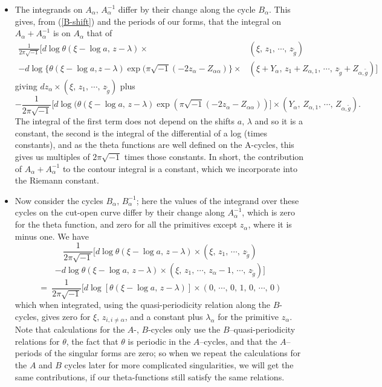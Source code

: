 \documentclass[12pt,reqno]{amsart}
\numberwithin{equation}{section}
\theoremstyle{definition}
\theoremstyle{remark}
\begin{document}
\begin{itemize} 
\item The integrands on $A_\alpha,\,  A_\alpha^{-1}$ differ by their change along the  cycle $B_\alpha$.
This gives, from (\ref{B-shift}) and the periods of our forms, that the integral on $A_\alpha + A_\alpha^{-1}$ is on $A_\alpha$ that of
\begin{align*}
\frac{1}{2\pi\sqrt{-1}}\Big[d\log \theta(\xi -\log a,\, z-\lambda )\times &(\xi,\, z_1,\,\cdots ,\,
z_{\widetilde g})\\
-d\log \{\theta(\xi -\log a, z-\lambda)\exp (\pi\sqrt{-1}(-2z_\alpha -Z_{\alpha\alpha})\}
\times &(\xi +Y_\alpha,\, z_1+Z_{\alpha,1},\,\cdots ,\, z_{\widetilde g}+Z_{\alpha, \widetilde g})\Big]\end{align*}
giving $ dz_\alpha \times  (\xi,\, z_1,\,\cdots ,\,z_{\widetilde g})$ plus 
\begin{equation*}-\frac{1}{2\pi\sqrt{-1}}\big[d\log (\theta(\xi -\log a,\, z-\lambda)
\exp( \pi \sqrt{-1} (-2z_\alpha -Z_{\alpha\alpha}))\big] \times  ( Y_\alpha,\, Z_{\alpha,1},\,
\cdots ,\, Z_{\alpha, \widetilde g}).
\end{equation*}
The integral of the first term does not depend on the shifts $a,\, \lambda$ and so it is a constant,
the second is the integral of the differential of a log (times constants), and as the theta functions
are well defined on the A-cycles, this gives us multiples of $2\pi\sqrt{-1}$ times those constants.
In short, the contribution of $A_\alpha + A_\alpha^{-1}$ to the contour integral is a constant, which we incorporate into the Riemann constant.

\item Now consider the cycles  $B_\alpha,\, B_\alpha^{-1}$; here the values of the integrand over these
cycles on the cut-open curve differ by their change along $A_\alpha^{-1}$, which is zero for the theta function, and zero for all the primitives except $z_\alpha$, where it is minus one.  We have 
$$
\frac{1}{2\pi\sqrt{-1}}[d\log\theta(\xi -\log a,\, z-\lambda )\times (\xi,\, z_1,\,\cdots ,\, z_{\widetilde g})
$$
$$
-d\log\theta(\xi -\log a,\, z-\lambda)\times   (\xi ,\, z_1 ,\, \cdots ,\, z_\alpha-1,\,\cdots ,\,
z_{\widetilde g} ) ]
$$
$$
=\ \frac{1}{2\pi\sqrt{-1}} [ d\log [\theta(\xi -\log a,\, z-\lambda)  ] \times ( 0,\,\cdots ,\, 0,\,
1,\,0,\, \cdots ,\,0)
$$
which when integrated, using the quasi-periodicity relation along the $B$-cycles, gives zero for $\xi,\,
z_{i, i\neq \alpha}$, and a constant plus $\lambda_\alpha$ for the primitive $z_\alpha$. 
Note that calculations for the $A$-, $B$-cycles only use the $B$--quasi-periodicity relations for $\theta$, the fact that
$\theta$ is periodic in the $A$--cycles, and that the $A$--periods of the singular forms are zero; so when we repeat the calculations for the $A$ and $B$ cycles later for more complicated  
singularities, we will get the same contributions, if our theta-functions still satisfy the same relations.


\end{itemize}
\end{document}
